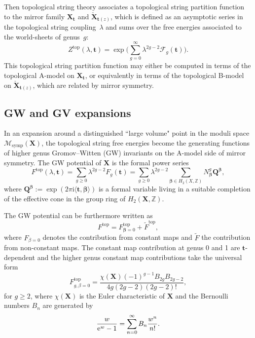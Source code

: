 \documentclass[pdftex]{sigma}
\numberwithin{equation}{section}
\begin{document}
Then topological string theory associates a topological string partition function to the mirror family $\mathbf{X}_\mathbf{t}$ and $\check{\mathbf{X}}_{\mathbf{t}(z)}$, which is defined as an asymptotic series in the topological string coupling~$\lambda$ and sums over the free energies associated to the world-sheets of genus~$g$:
\begin{equation*}
Z^{\mathrm{top}} (\lambda,\mathbf{t})= \exp \bigg(\sum_{g=0}^{\infty} \lambda^{2g-2} \mathcal{F}_{g}(\mathbf{t})\bigg).
\end{equation*}
This topological string partition function may either be computed in terms of the topological A-model on $\mathbf{X}_\mathbf{t}$, or equivalently in terms of the topological B-model on $\check{\mathbf{X}}_{\mathbf{t}(z)}$, which are related by mirror symmetry.


\subsection{GW and GV expansions}
 In an expansion around a distinguished ``large volume" point in the moduli space $\mathcal{M}_\mathrm{symp}(\mathbf{X})$, the topological string free energies become the generating functions of higher genus Gromov--Witten (GW) invariants on the A-model side of mirror symmetry. The GW potential of $\mathbf{X}$ is the formal power series
\begin{equation*}
F^\mathrm{top}(\lambda,\mathbf{t}) = \sum_{g\ge 0} \lambda^{2g-2} F_g(\mathbf{t})= \sum_{g\ge 0} \lambda^{2g-2} \sum_{\mathbf{\beta}\in H_2(X,\mathbb{Z})} N^g_{\mathbf{\beta}} \mathbf{Q}^{\mathbf{\beta}},
\end{equation*}
where $\mathbf{Q}^{\mathbf{\beta}} := \exp (2\pi \mathrm{i} \langle \mathbf{t},\mathbf{\beta} \rangle)$ is a formal variable living in a suitable completion of the effective cone in the group ring of $H_2(\mathbf{X},\mathbb{Z})$.

The GW potential can be furthermore written as
\begin{equation*}
F^\mathrm{top}=F^\mathrm{top}_{\mathbf{\beta}=0} + \tilde{F}^\mathrm{top},
\end{equation*}
where $F_{\beta=0}$ denotes the contribution from constant maps and $ \tilde{F}$ the contribution from non-constant maps. The constant map contribution at genus 0 and 1 are $\mathbf{t}$-dependent and the higher genus constant map contributions take the universal form \cite{Faber}
\begin{equation*}
F^\mathrm{top}_{g,\beta=0} = \frac{\chi(\mathbf{X})(-1)^{g-1} B_{2g} B_{2g-2}}{4g (2g-2) (2g-2)!},
\end{equation*}
for $g\ge2$, where $\chi(\mathbf{X})$ is the Euler characteristic of $\mathbf{X}$ and the Bernoulli numbers $B_n$ are generated by
\begin{equation*}
\frac{w}{{\rm e}^w-1} = \sum_{n=0}^{\infty} B_n \frac{w^n}{n!}.
\end{equation*}
\end{document}
